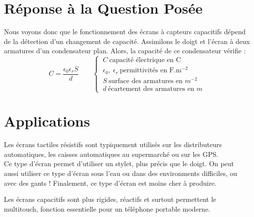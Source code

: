 \documentclass[DIV=12]{scrartcl}
\begin{document}
   \section{Réponse à la Question Posée}
   Nous voyons donc que le fonctionnement des écrans à capteurs capacitifs dépend de la détection d'un changement de capacité. Assimilons le doigt et l'écran à deux armatures d'un condensateur plan. Alors, la capacité de ce condensateur vérifie : 
   \[C=\frac{\epsilon_0\epsilon_r S}{d}\qquad\begin{cases}~C~\text{capacité électrique en C}\\~\epsilon_0,~\epsilon_r~\text{permittivités en $\si{\farad.\meter^{-2}}$}\\~S~\text{surface des armatures en $\si{m^{-2}}$}\\~d~\text{écartement des armatures en $\si{m}$}\end{cases}\]
   \section{Applications}
   Les écrans tactiles résistifs sont typiquement utilisés sur les distributeurs automatiques, les caisses automatiques au supermarché ou sur les GPS. \\
   Ce type d'écran permet d'utiliser un stylet, plus précis que le doigt. On peut aussi utiliser ce type d'écran sous l'eau ou dans des environments difficiles, ou avec des gants ! Finalement, ce type d'écran est moins cher à produire.

   Les écrans capacitifs sont plus rigides, réactifs et surtout permettent le multitouch, fonction essentielle pour un téléphone portable moderne.
\end{document}
